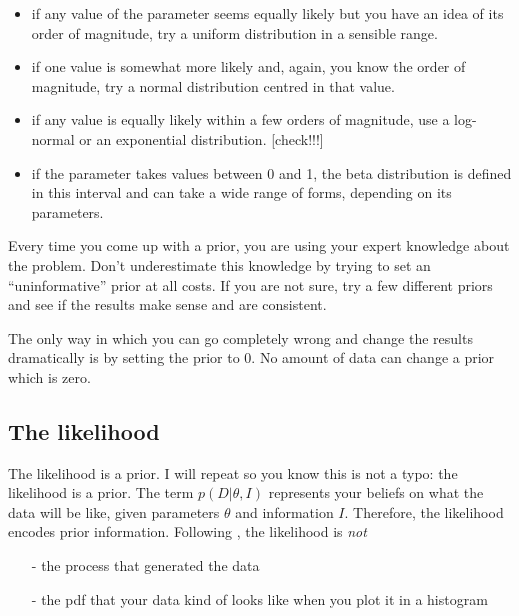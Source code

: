 \documentclass[a4paper,11pt]{article}
\begin{document}
\begin{itemize}
  \item if any value of the parameter seems equally likely but you have an idea of its order of magnitude, try a uniform distribution in a sensible range.
  \item if one value is somewhat more likely and, again, you know the order of magnitude, try a normal distribution centred in that value.
  \item if any value is equally likely within a few orders of magnitude, use a log-normal or an exponential distribution. [check!!!]
  \item if the parameter takes values between 0 and 1, the beta distribution is defined in this interval and can take a wide range of forms, depending on its parameters.
\end{itemize}

Every time you come up with a prior, you are using your expert knowledge about the problem.
Don't underestimate this knowledge by trying to set an ``uninformative'' prior at all costs.
If you are not sure, try a few different priors and see if the results make sense and are consistent. 

The only way in which you can go completely wrong and change the results dramatically is by setting the prior to 0. No amount of data can change a prior which is zero.






\subsection{The likelihood}\label{sec:likelihood}

The likelihood is a prior.
I will repeat so you know this is not a typo: the likelihood is a prior.
The term $p(D|\theta,I)$ represents your beliefs on what the data will be like, given parameters $\theta$ and information $I$.
Therefore, the likelihood encodes prior information.
%
Following \cite{Brewer2013}, the likelihood is \emph{not} 
\begin{itemize}
   \item[-] the process that generated the data
   \item[-] the pdf that your data kind of looks like when you plot it in a histogram
\end{itemize}
\end{document}
